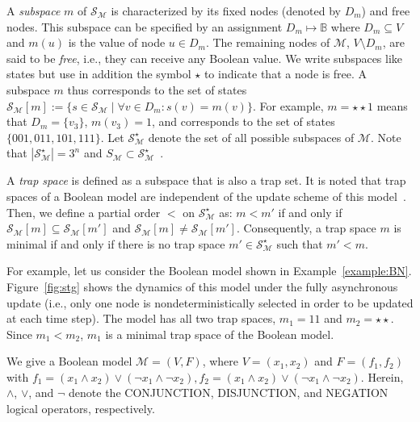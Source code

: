 \documentclass[runningheads]{llncs}
\begin{document}
A \emph{subspace} \(m\) of \(\mathcal{S}_{\mathcal{M}}\) is characterized by its fixed nodes (denoted by \(D_m\)) and free nodes.
This subspace can be specified by an assignment \(D_m \mapsto \mathbb{B}\) where \(D_m \subseteq V\) and \(m(u)\) is the value of node \(u \in D_m\).
The remaining nodes of \(\mathcal{M}\), \(V \setminus D_m\), are said to be \emph{free}, i.e., they can receive any Boolean value.
We write subspaces like states but use in addition the symbol \(\star\) to indicate that a node is free.
A subspace \(m\) thus corresponds to the set of states \(\mathcal{S}_{\mathcal{M}}[m] := \{s \in \mathcal{S}_{\mathcal{M}}\;|\;\forall v \in D_m : s(v) = m(v)\}\).
For example, \(m = \star\star1\) means that \(D_m = \{v_3\}\), \(m(v_3) = 1\), and corresponds to the set of states \(\{001, 011, 101, 111\}\).
Let \(\mathcal{S}_{\mathcal{M}}^{\star}\) denote the set of all possible subspaces of \(\mathcal{M}\). Note that \(\left|\mathcal{S}_{\mathcal{M}}^{\star}\right| = 3^n\) and \(S_{\mathcal{M}} \subset \mathcal{S}_{\mathcal{M}}^{\star}\)~\cite{klarner2015computing}.

A \emph{trap space} is defined as a subspace that is also a trap set.
It is noted that trap spaces of a Boolean model are independent of the update scheme of this model~\cite{klarner2015computing}.
Then, we define a partial order \(<\) on \(\mathcal{S}_{\mathcal{M}}^{\star}\) as: \(m < m'\) if and only if \(\mathcal{S}_{\mathcal{M}}[m] \subseteq \mathcal{S}_{\mathcal{M}}[m']\) and \(\mathcal{S}_{\mathcal{M}}[m] \neq \mathcal{S}_{\mathcal{M}}[m']\).
Consequently, a trap space \(m\) is minimal if and only if there is no trap space \(m' \in \mathcal{S}_{\mathcal{M}}^{\star}\) such that \(m' < m\).

For example, let us consider the Boolean model shown in Example~\ref{example:BN}.
Figure~\ref{fig:stg} shows the dynamics of this model under the fully asynchronous update (i.e., only one node is nondeterministically selected in order to be updated at each time step).
The model has all two trap spaces, \(m_1 = 11\) and \(m_2 = \star\star\).
Since \(m_1 < m_2\), \(m_1\) is a minimal trap space of the Boolean model.

\begin{example}
We give a Boolean model \(\mathcal{M} = (V, F)\), where \(V = (x_1, x_2)\) and \(F = (f_1, f_2)\) with \(f_1 = (x_1 \land x_2) \lor (\neg x_1 \land \neg x_2), f_2 = (x_1 \land x_2) \lor (\neg x_1 \land \neg x_2)\). Herein, \(\land\), \(\lor\), and \(\neg\) denote the CONJUNCTION, DISJUNCTION, and NEGATION logical operators, respectively.\label{example:BN}
\end{example}
\end{document}
